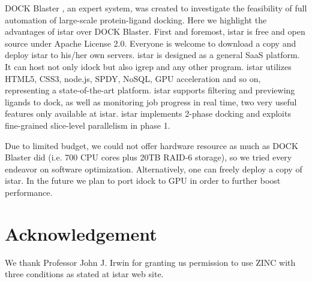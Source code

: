 \documentclass{bioinfo}
\begin{document}
DOCK Blaster \citep{557}, an expert system, was created to investigate the feasibility of full automation of large-scale protein-ligand docking. Here we highlight the advantages of istar over DOCK Blaster. First and foremost, istar is free and open source under Apache License 2.0. Everyone is welcome to download a copy and deploy istar to his/her own servers. istar is designed as a general SaaS platform. It can host not only idock but also igrep and any other program. istar utilizes HTML5, CSS3, node.js, SPDY, NoSQL, GPU acceleration and so on, representing a state-of-the-art platform. istar supports filtering and previewing ligands to dock, as well as monitoring job progress in real time, two very useful features only available at istar. istar implements 2-phase docking and exploits fine-grained slice-level parallelism in phase 1.

Due to limited budget, we could not offer hardware resource as much as DOCK Blaster did (i.e. 700 CPU cores plus 20TB RAID-6 storage), so we tried every endeavor on software optimization. Alternatively, one can freely deploy a copy of istar. In the future we plan to port idock to GPU in order to further boost performance.

\section*{Acknowledgement}

We thank Professor John J. Irwin for granting us permission to use ZINC with three conditions as stated at istar web site.



\end{document}
